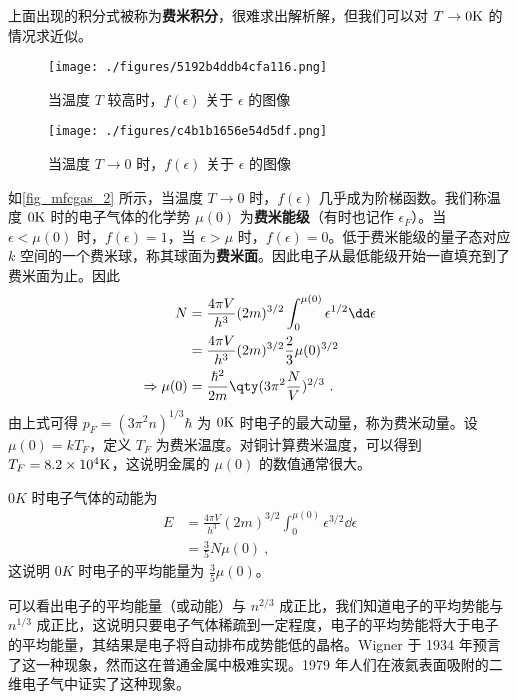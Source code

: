 上面出现的积分式被称为\textbf{费米积分}，很难求出解析解，但我们可以对 $T\rightarrow 0 \rm{K}$ 的情况求近似。
\begin{figure}[ht]
\centering
\texttt{[image: ./figures/5192b4ddb4cfa116.png]}
\caption{当温度 $T$ 较高时，$f(\epsilon )$ 关于 $\epsilon$ 的图像} \label{fig_mfcgas_1}
\end{figure}
\begin{figure}[ht]
\centering
\texttt{[image: ./figures/c4b1b1656e54d5df.png]}
\caption{当温度 $T\rightarrow 0$ 时，$f(\epsilon )$ 关于 $\epsilon$ 的图像} \label{fig_mfcgas_2}
\end{figure}

如\autoref{fig_mfcgas_2} 所示，当温度 $T\rightarrow 0$ 时，$f(\epsilon)$ 几乎成为阶梯函数。我们称温度 $0\rm{K}$ 时的电子气体的化学势 $\mu(0)$ 为\textbf{费米能级}（有时也记作 $\epsilon_F$）。当 $\epsilon<\mu(0)$ 时，$f(\epsilon)=1$，当 $\epsilon>\mu$ 时，$f(\epsilon)=0$。低于费米能级的量子态对应 $k$ 空间的一个费米球，称其球面为\textbf{费米面}。因此电子从最低能级开始一直填充到了费米面为止。因此
\begin{equation}
\begin{aligned}
N&=\frac{4\pi V}{h^3}(2m)^{3/2}\int_0^{\mu(0)}\epsilon^{1/2}\dd \epsilon
\\
&=\frac{4\pi V}{h^3}(2m)^{3/2}\frac{2}{3}\mu(0)^{3/2}\\
\Rightarrow \mu(0)&=\frac{\hbar^2}{2m}\qty(3\pi^2\frac{N}{V})^{2/3}~.
\end{aligned}
\end{equation}
由上式可得 $p_F=(3\pi^2n)^{1/3}\hbar$ 为 $0\rm{K}$ 时电子的最大动量，称为费米动量。设 $\mu(0)=kT_F$，定义 $T_F$ 为费米温度。对铜计算费米温度，可以得到 $T_F=8.2\times 10^4 \rm{K}$，这说明金属的 $\mu(0)$ 的数值通常很大。

$0K$ 时电子气体的动能为
\begin{equation}
\begin{aligned}
E&=\frac{4\pi V}{h^3}(2m)^{3/2}\int_0^{\mu(0)} \epsilon^{3/2}\dd \epsilon\\
&=\frac{3}{5}N\mu(0)~,
\end{aligned}
\end{equation}
这说明 $0K$ 时电子的平均能量为 $\frac{3}{5}\mu(0)$。

可以看出电子的平均能量（或动能）与 $n^{2/3}$ 成正比，我们知道电子的平均势能与 $n^{1/3}$ 成正比，这说明只要电子气体稀疏到一定程度，电子的平均势能将大于电子的平均能量，其结果是电子将自动排布成势能低的晶格。Wigner 于 1934 年预言了这一种现象，然而这在普通金属中极难实现。1979 年人们在液氦表面吸附的二维电子气中证实了这种现象。

